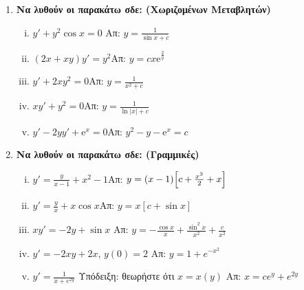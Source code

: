 \documentclass[a4paper,table]{report}
\begin{document}
\begin{center}
\end{center}

\vspace{\baselineskip}


\begin{enumerate}
  \item  {\bfseries Να λυθούν οι παρακάτω σδε: (Χωριζομένων Μεταβλητών)}
    \begin{enumerate}[i)]
      \item $ y'+y^{2} \cos{x} = 0 $ \hfill Απ: $ y = \frac{1}{\sin{x} + c} $  %
      \item $(2x+xy)y'=y^2$\hfill Απ: $y=cx \mathrm{e}^{\frac{2}{y}}$
      \item $y'+2xy^2=0$\hfill Απ: $y=\frac{1}{x^2+c}$ %
      \item $xy'+y^2=0$\hfill Απ: $y=\frac{1}{\ln|x|+c}$ %
      \item $y'-2yy'+ \mathrm{e}^x=0$\hfill Απ: $y^2-y- \mathrm{e}^x=c$ %
    \end{enumerate}


  \item {\bfseries Να λυθούν οι παρακάτω σδε: (Γραμμικές)}
    \begin{enumerate}[i)]
      \item $y'=\frac{y}{x-1}+x^2-1$\hfill Απ: $y=(x-1)\Bigl[c+\frac{x^2}{2}+x\Bigr]$
      \item $y'=\frac{y}{x}+x\cos x$\hfill Απ: $y=x[c+\sin x]$
      \item $xy'=-2y+ \sin{x}$ \hfill Απ: $ y= - \frac{\cos{x}}{x} +
        \frac{\sin^{2}{x}}{x^{2}} + \frac{c}{x^{2}} $ 
      \item $ y'=-2xy+2x $, \quad $ y(0)=2 $ \hfill Απ: $ y=1+e^{-x^{2}} $  
      \item $y'=\frac{1}{x+e^{2y}}$ \quad 
        \textcolor{Col1}{Υπόδειξη:} θεωρήστε ότι $ x=x(y) $ \hfill Απ: $x=ce^y+e^{2y}$ 
    \end{enumerate}


\end{enumerate}
\end{document}
